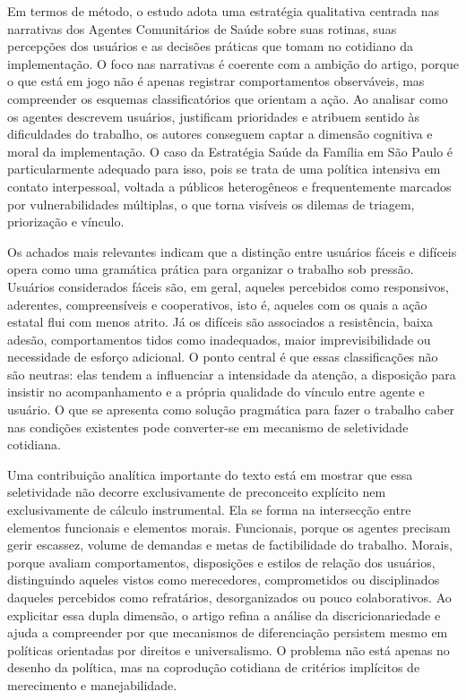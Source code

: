 \documentclass[12pt,a4paper]{article}
\begin{document}
Em termos de método, o estudo adota uma estratégia qualitativa centrada nas narrativas dos Agentes Comunitários de Saúde sobre suas rotinas, suas percepções dos usuários e as decisões práticas que tomam no cotidiano da implementação. O foco nas narrativas é coerente com a ambição do artigo, porque o que está em jogo não é apenas registrar comportamentos observáveis, mas compreender os esquemas classificatórios que orientam a ação. Ao analisar como os agentes descrevem usuários, justificam prioridades e atribuem sentido às dificuldades do trabalho, os autores conseguem captar a dimensão cognitiva e moral da implementação. O caso da Estratégia Saúde da Família em São Paulo é particularmente adequado para isso, pois se trata de uma política intensiva em contato interpessoal, voltada a públicos heterogêneos e frequentemente marcados por vulnerabilidades múltiplas, o que torna visíveis os dilemas de triagem, priorização e vínculo. \parencite{lotta2020_categorizando_usuarios}

Os achados mais relevantes indicam que a distinção entre usuários fáceis e difíceis opera como uma gramática prática para organizar o trabalho sob pressão. Usuários considerados fáceis são, em geral, aqueles percebidos como responsivos, aderentes, compreensíveis e cooperativos, isto é, aqueles com os quais a ação estatal flui com menos atrito. Já os difíceis são associados a resistência, baixa adesão, comportamentos tidos como inadequados, maior imprevisibilidade ou necessidade de esforço adicional. O ponto central é que essas classificações não são neutras: elas tendem a influenciar a intensidade da atenção, a disposição para insistir no acompanhamento e a própria qualidade do vínculo entre agente e usuário. O que se apresenta como solução pragmática para fazer o trabalho caber nas condições existentes pode converter-se em mecanismo de seletividade cotidiana. \parencite{lotta2020_categorizando_usuarios}

Uma contribuição analítica importante do texto está em mostrar que essa seletividade não decorre exclusivamente de preconceito explícito nem exclusivamente de cálculo instrumental. Ela se forma na intersecção entre elementos funcionais e elementos morais. Funcionais, porque os agentes precisam gerir escassez, volume de demandas e metas de factibilidade do trabalho. Morais, porque avaliam comportamentos, disposições e estilos de relação dos usuários, distinguindo aqueles vistos como merecedores, comprometidos ou disciplinados daqueles percebidos como refratários, desorganizados ou pouco colaborativos. Ao explicitar essa dupla dimensão, o artigo refina a análise da discricionariedade e ajuda a compreender por que mecanismos de diferenciação persistem mesmo em políticas orientadas por direitos e universalismo. O problema não está apenas no desenho da política, mas na coprodução cotidiana de critérios implícitos de merecimento e manejabilidade. \parencite{lotta2020_categorizando_usuarios,lotta2019_teorias_analises}
\end{document}
